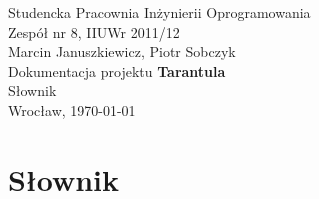 \documentclass[11pt,leqno]{article}
\begin{document}
\begin{center}
\thispagestyle{empty}
{\Large Studencka Pracownia Inżynierii Oprogramowania}\\[0.5cm]
{\Large Zespół nr 8, IIUWr 2011/12}\\[2.5cm]

{\large Marcin Januszkiewicz, Piotr Sobczyk}\\[0.5cm]
{\huge Dokumentacja projektu \textbf{Tarantula}}\\[0.25cm]
{\huge Słownik}\\[0.5cm]
\vfill
{\large Wrocław, \today}
\end{center}

\newpage


\section{Słownik}
\end{document}
